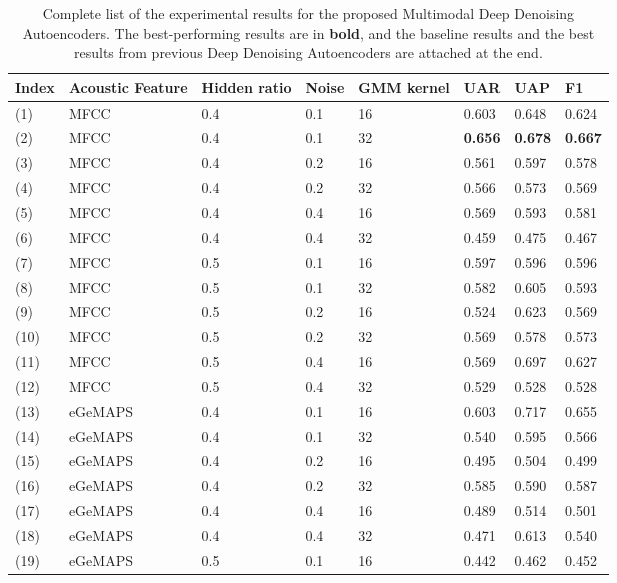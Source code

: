 \begin{table}[htb]
    \centering
    \small
    \caption{Complete list of the experimental results for the proposed Multimodal Deep Denoising Autoencoders. The best-performing results are in \textbf{bold}, and the baseline results and the best results from previous Deep Denoising Autoencoders are attached at the end.}
    \begin{tabular}{l|p{1.8cm}|p{1.25cm}|l|p{1.2cm}|l|l|l}
        \Xhline{2\arrayrulewidth}
        Index & Acoustic Feature & Hidden ratio & Noise & GMM kernel & UAR & UAP & F1 \\
        \hline
        (1) & MFCC  & 0.4 & 0.1 & 16 & 0.603 & 0.648 & 0.624 \\
        (2) & MFCC  & 0.4 & 0.1 & 32 & \textbf{0.656} & \textbf{0.678} & \textbf{0.667} \\
        (3) & MFCC  & 0.4 & 0.2 & 16 & 0.561 & 0.597 & 0.578  \\
        (4) & MFCC  & 0.4 & 0.2 & 32 & 0.566 & 0.573 & 0.569 \\
        (5) & MFCC  & 0.4 & 0.4 & 16 & 0.569 & 0.593 & 0.581 \\
        (6) & MFCC  & 0.4 & 0.4 & 32 & 0.459 & 0.475 & 0.467 \\
        (7) & MFCC  & 0.5 & 0.1 & 16 & 0.597 & 0.596 & 0.596 \\
        (8) & MFCC  & 0.5 & 0.1 & 32 & 0.582 & 0.605 & 0.593 \\
        (9) & MFCC  & 0.5 & 0.2 & 16 & 0.524 & 0.623 & 0.569 \\
        (10) & MFCC  & 0.5 & 0.2 & 32 & 0.569 & 0.578 & 0.573 \\
        (11) & MFCC  & 0.5 & 0.4 & 16 & 0.569 & 0.697 & 0.627 \\
        (12) & MFCC  & 0.5 & 0.4 & 32 & 0.529 & 0.528 & 0.528 \\
        \hline
        (13) & eGeMAPS & 0.4 & 0.1 & 16 & 0.603 & 0.717 & 0.655 \\
        (14) & eGeMAPS & 0.4 & 0.1 & 32 & 0.540 & 0.595 & 0.566 \\
        (15) & eGeMAPS & 0.4 & 0.2 & 16 & 0.495 & 0.504 & 0.499 \\
        (16) & eGeMAPS & 0.4 & 0.2 & 32 & 0.585 & 0.590 & 0.587 \\
        (17) & eGeMAPS & 0.4 & 0.4 & 16 & 0.489 & 0.514 & 0.501 \\
        (18) & eGeMAPS & 0.4 & 0.4 & 32 & 0.471 & 0.613 & 0.540 \\
        (19) & eGeMAPS & 0.5 & 0.1 & 16 & 0.442 & 0.462 & 0.452 \\

\end{tabular}
\end{table}
